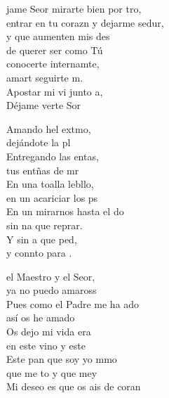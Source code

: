 \begin{cancion}%
	jame Seor mirarte bien por tro,\\
	entrar en tu corazn y dejarme sedur,\\
	y que aumenten mis des \\
	de querer ser como Tú\\
	conocerte internamte, \\
	amart seguirte m.\\
	Apostar mi vi junto a,\\
	Déjame verte Sor\jump\\
	\begin{chorus}%
		Amando hel extmo, \\
		dejándote la pl\\
		Entregando las entas, \\
		tus entñas de mr\\
		En una toalla lebllo, \\
		en un acariciar los ps\\
		En un mirarnos hasta el do \\
		sin na que reprar.\\
		Y sin a que ped, \\
		y connto para .\jump\\
	\end{chorus}%
	 el Maestro y el Seor, \\
	ya no puedo amaross\\
	Pues como el Padre me ha ado \\
	así os he amado  \\
	Os dejo mi vida era \\
	en este vino y este  \\
	Este pan que soy yo mmo \\
	que me to y que mey\\
	Mi deseo es que os ais de coran\\

\end{cancion}
